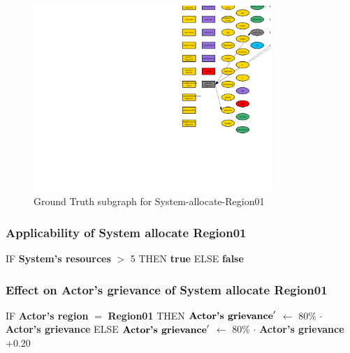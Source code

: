\documentclass{article}%
\begin{document}
\begin{figure}[ht]%
\centering%
\includegraphics[width=0.8\textwidth]{images/System-allocate-Region01.png}%
\caption{Ground Truth subgraph for System{-}allocate{-}Region01}%
\end{figure}

%
\subsubsection{Applicability of System allocate Region01}%
\label{ssubsec:Applicability of System allocate Region01}%
\begin{flushleft}%
IF %
\textbf{System's resources}%
$>$%
5%
\linebreak%
\hspace*{2em}%
THEN %
\textbf{true}%
\linebreak%
\hspace*{2em}%
ELSE %
\textbf{false}%
\end{flushleft}

%
\subsubsection{Effect on Actor's grievance of System allocate Region01}%
\label{ssubsec:Effect on Actor's grievance of System allocate Region01}%
\begin{flushleft}%
IF %
\textbf{Actor's region}%
$=$%
\textbf{Region01}%
\linebreak%
\hspace*{2em}%
THEN %
$\mbox{\textbf{Actor's grievance}} '$%
$\leftarrow$%
80\%%
$\cdot$%
\textbf{Actor's grievance}%
\linebreak%
\hspace*{2em}%
ELSE %
$\mbox{\textbf{Actor's grievance}} '$%
$\leftarrow$%
80\%%
$\cdot$%
\textbf{Actor's grievance}%
+0.20%
\end{flushleft}
\end{document}
